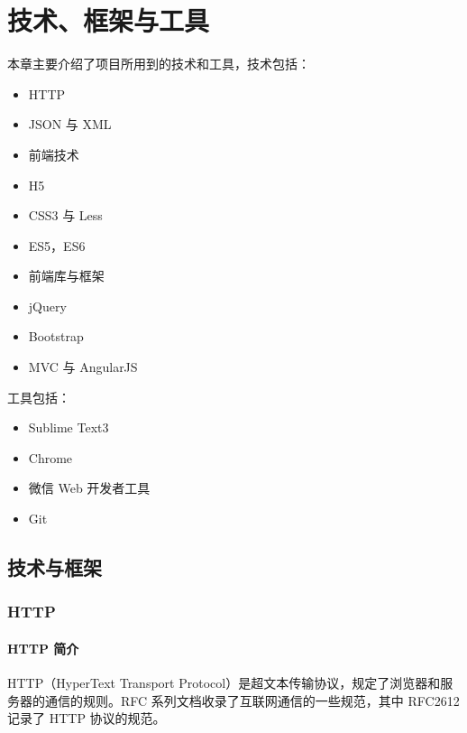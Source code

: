 
\chapter{技术、框架与工具}
  \label{chap:技术与工具}
    本章主要介绍了项目所用到的技术和工具，技术包括：
    \begin{itemize}
      \item HTTP
      \item JSON 与 XML
      \item 前端技术
      \item H5
      \item CSS3 与 Less
      \item ES5，ES6
      \item 前端库与框架
      \item jQuery
      \item Bootstrap
      \item MVC 与 AngularJS
    \end{itemize}

    工具包括：

    \begin{itemize}
      \item Sublime Text3
      \item Chrome
      \item 微信 Web 开发者工具
      \item Git
    \end{itemize}

    \section{技术与框架}
      \label{sec:技术框架}
        \subsection{HTTP}
          \label{subsec:http}
            \subsubsection{HTTP 简介}
              \label{subsubsec:http_简介}
                HTTP（HyperText Transport Protocol）是超文本传输协议，规定了浏览器和服务器的通信的规则。RFC 系列文档收录了互联网通信的一些规范，其中 RFC2612 记录了 HTTP 协议的规范。

